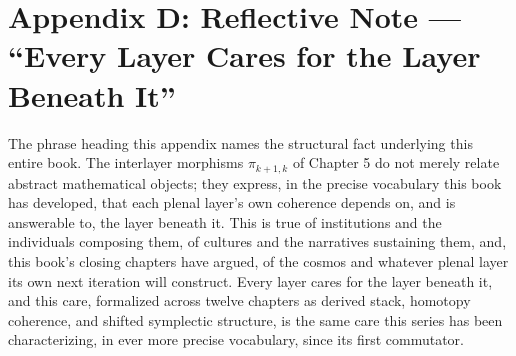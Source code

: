 \chapter*{Appendix D: Reflective Note --- ``Every Layer Cares for the Layer Beneath It''}

The phrase heading this appendix names the structural fact underlying this entire book. The interlayer morphisms $\pi_{k+1,k}$ of Chapter 5 do not merely relate abstract mathematical objects; they express, in the precise vocabulary this book has developed, that each plenal layer's own coherence depends on, and is answerable to, the layer beneath it. This is true of institutions and the individuals composing them, of cultures and the narratives sustaining them, and, this book's closing chapters have argued, of the cosmos and whatever plenal layer its own next iteration will construct. Every layer cares for the layer beneath it, and this care, formalized across twelve chapters as derived stack, homotopy coherence, and shifted symplectic structure, is the same care this series has been characterizing, in ever more precise vocabulary, since its first commutator.

